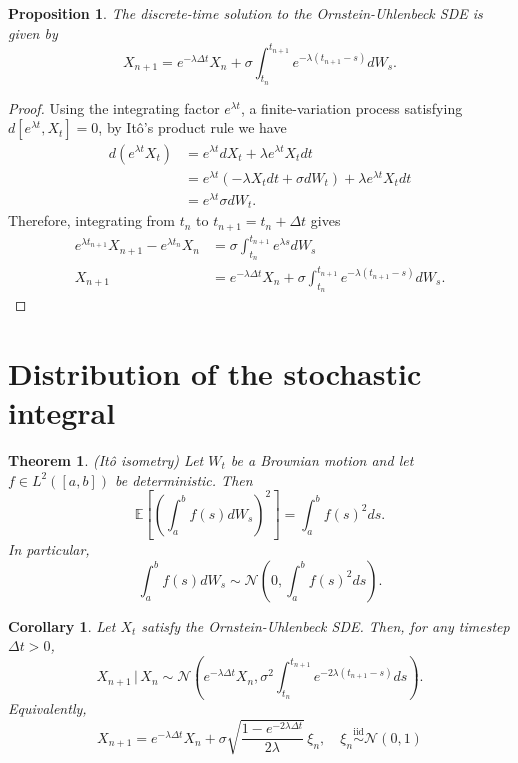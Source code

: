 \documentclass[12pt,reqno]{amsart}
\theoremstyle{plain}
\newtheorem{theorem}{Theorem}
\newtheorem{proposition}{Proposition}
\newtheorem{corollary}{Corollary}
\begin{document}
\begin{proposition}{}
    The discrete-time solution to the Ornstein-Uhlenbeck SDE is given by
    \begin{equation*}
        X_{n+1} = e^{-\lambda \Delta t} X_n + \sigma \int_{t_n}^{t_{n+1}} e^{-\lambda (t_{n+1}-s)} dW_s.
    \end{equation*}
    \label{prop:discrete_solution}
\end{proposition}
\begin{proof}
    Using the integrating factor $e^{\lambda t}$, a finite-variation process satisfying $d[e^{\lambda t}, X_t] = 0$, by Itô's product rule we have
    \begin{align*}
        d(e^{\lambda t} X_t) &= e^{\lambda t}dX_t + \lambda e^{\lambda t} X_t dt\\
        &= e^{\lambda t}(-\lambda X_t dt + \sigma dW_t) + \lambda e^{\lambda t} X_t dt\\
        &= e^{\lambda t} \sigma dW_t.
    \end{align*}
    Therefore, integrating from $t_n$ to $t_{n+1} = t_n + \Delta t$ gives
    \begin{align*}
        e^{\lambda t_{n+1}}X_{n+1} - e^{\lambda t_n}X_n &= \sigma \int_{t_n}^{t_{n+1}} e^{\lambda s} dW_s\\
        X_{n+1} &= e^{-\lambda \Delta t} X_n + \sigma \int_{t_n}^{t_{n+1}} e^{-\lambda (t_{n+1}-s)} dW_s.
    \end{align*}
\end{proof}


\section{Distribution of the stochastic integral}
\begin{theorem}{(Itô isometry)}
    Let $W_t$ be a Brownian motion and let $f\in L^2([a,b])$ be deterministic. Then
    \begin{equation*}
        \mathbb{E}\left[\left(\int_a^b f(s) dW_s\right)^2\right] = \int_a^b f(s)^2 ds.
    \end{equation*}
    In particular,
    \begin{equation*}
        \int_a^b f(s) dW_s \sim \mathcal{N}\left(0, \int_a^b f(s)^2 ds\right).
    \end{equation*}
    \label{thm:ito_isometry}
\end{theorem}

\begin{corollary}{}
    Let $X_t$ satisfy the Ornstein-Uhlenbeck SDE. Then, for any timestep $\Delta t > 0$,
    \begin{equation*}
        X_{n+1}\,\vert\,X_n \sim \mathcal{N}\left( e^{-\lambda \Delta t} X_n, \sigma^2 \int_{t_n}^{t_{n+1}} e^{-2\lambda (t_{n+1}-s)} ds \right).
    \end{equation*}
    Equivalently,
    \begin{equation}
        X_{n+1} = e^{-\lambda \Delta t} X_n + \sigma \sqrt{\frac{1-e^{-2\lambda \Delta t}}{2\lambda}}\,\xi_n,\quad \xi_n \overset{\mathrm{iid}}{\sim} \mathcal{N}(0,1)
    \end{equation}
    \label{cor:discrete_distribution}
\end{corollary}
\end{document}
